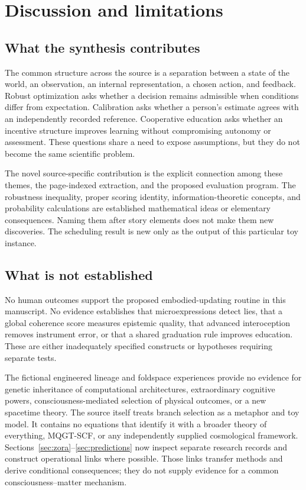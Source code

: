 \section{Discussion and limitations}
\subsection{What the synthesis contributes}
The common structure across the source is a separation between a state of the world, an observation, an internal representation, a chosen action, and feedback. Robust optimization asks whether a decision remains admissible when conditions differ from expectation. Calibration asks whether a person's estimate agrees with an independently recorded reference. Cooperative education asks whether an incentive structure improves learning without compromising autonomy or assessment. These questions share a need to expose assumptions, but they do not become the same scientific problem.

The novel source-specific contribution is the explicit connection among these themes, the page-indexed extraction, and the proposed evaluation program. The robustness inequality, proper scoring identity, information-theoretic concepts, and probability calculations are established mathematical ideas or elementary consequences. Naming them after story elements does not make them new discoveries. The scheduling result is new only as the output of this particular toy instance.

\subsection{What is not established}
No human outcomes support the proposed embodied-updating routine in this manuscript. No evidence establishes that microexpressions detect lies, that a global coherence score measures epistemic quality, that advanced interoception removes instrument error, or that a shared graduation rule improves education. These are either inadequately specified constructs or hypotheses requiring separate tests.

The fictional engineered lineage and foldspace experiences provide no evidence for genetic inheritance of computational architectures, extraordinary cognitive powers, consciousness-mediated selection of physical outcomes, or a new spacetime theory. The source itself treats branch selection as a metaphor and toy model. It contains no equations that identify it with a broader theory of everything, MQGT-SCF, or any independently supplied cosmological framework. Sections~\ref{sec:zora}--\ref{sec:predictions} now inspect separate research records and construct operational links where possible. Those links transfer methods and derive conditional consequences; they do not supply evidence for a common consciousness--matter mechanism.

